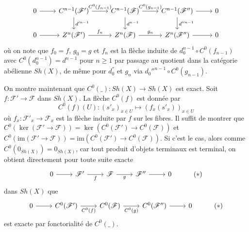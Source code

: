\documentclass[a4paper,12pt]{article}
\newcommand{\F}{\mathscr F}
\newcommand{\im}{\textrm{im}}
\theoremstyle{plain}
\theoremstyle{definition}
\theoremstyle{remark}
\begin{document}
\[\begin{tikzcd}
	0 & {C^{n-1}(\F')} & {C^{n-1}(\F)} & {C^{n-1}(\F'')} & 0 \\
	0 & {Z^n(\F')} & {Z^n(\F)} & {Z^n(\F'')} & 0
	\arrow["C^0(f_{n-1})", from=1-2, to=1-3]
	\arrow["d'^{n-1}", from=1-2, to=2-2]
	\arrow["C^0(g_{n-1})", from=1-3, to=1-4]
	\arrow["d^{n-1}", from=1-3, to=2-3]
	\arrow[from=1-4, to=1-5]
	\arrow[from=1-1, to=1-2]
	\arrow[from=2-4, to=2-5]
	\arrow["d''^{n-1}", from=1-4, to=2-4]
	\arrow[from=2-1, to=2-2]
	\arrow["{f_n}", from=2-2, to=2-3]
	\arrow["{g_n}", from=2-3, to=2-4]
\end{tikzcd}\]
où on note que $f_0=f$, $g_0=g$ et $f_n$ est la flèche induite de 
$d_0^{n-1}\circ C^0(f_{n-1})$ avec $C^0(d_0^{n-1})=d^{n-1}$ pour
$n\geq 1$ 
par passage au quotient dans la catégorie abélienne $Sh(X)$, de 
même pour $d_0^''$ et $g_n$  via $d_0''^{n-1}\circ C^0(g_{n-1})$.





On montre maintenant que $C^0(\_)\colon Sh(X)\to Sh(X)$ est
exact. Soit $f\colon \F'\to\F$ dans $Sh(X)$. La flèche $C^0(f)$ est 
donnée par
\[C^0(f)(U)\colon (s'_x)_{x\in U}\mapsto (f_x(s'_x))_{x\in U}\] 
où $f_x\colon \F'_x\to \F_x$ est la flèche induite par $f$ sur les
fibres. Il suffit de montrer que 
$C^0(\ker(\F'\to \F))=\ker(C^0(\F')\to C^0(\F))$
et $C^0(\im(\F'\to \F))=\im(C^0(\F')\to C^0(\F))$. Si c'est le cas,
alors comme $C^0(0_{Sh(X)})=0_{Sh(X)}$, car tout produit d'objets
terminaux est terminal, on obtient directement pour toute suite exacte
\[\begin{tikzcd}
	0 & {\F'} & \F & {\F''} & 0 & {(*)}
	\arrow[from=1-1, to=1-2]
	\arrow["f"', from=1-2, to=1-3]
	\arrow["g"', from=1-3, to=1-4]
	\arrow[from=1-4, to=1-5]
\end{tikzcd}\]
dans $Sh(X)$ que
\[\begin{tikzcd}
	0 & {C^0(\F')} & {C^0(\F)} & {C^0(\F'')} & 0 & {(*)}
	\arrow[from=1-1, to=1-2]
	\arrow["C^0(f)"', from=1-2, to=1-3]
	\arrow["C^0(g)"', from=1-3, to=1-4]
	\arrow[from=1-4, to=1-5]
\end{tikzcd}\]
est exacte par fonctorialité de $C^0(\_)$. 
\end{document}
